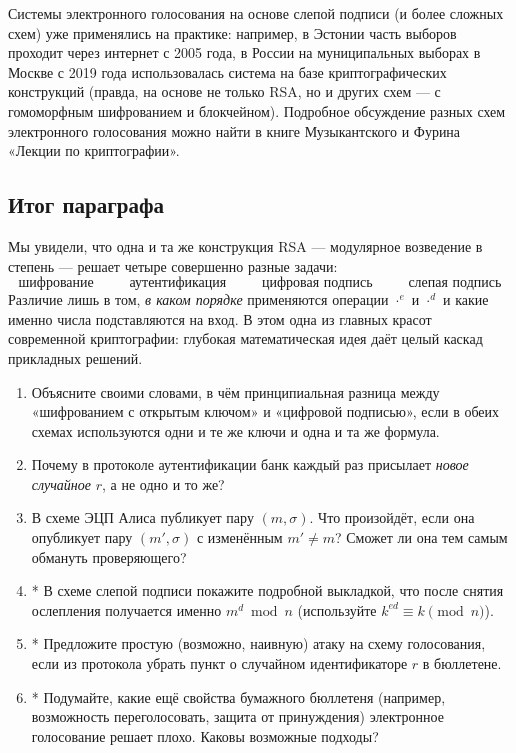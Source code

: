 \begin{interestbox}[title={Это интересно: голосование в реальности}]
Системы электронного голосования на основе слепой подписи (и более сложных схем) уже применялись на практике: например, в Эстонии часть выборов проходит через интернет с 2005 года, в России на муниципальных выборах в Москве с 2019 года использовалась система на базе криптографических конструкций (правда, на основе не только RSA, но и других схем --- с гомоморфным шифрованием и блокчейном). Подробное обсуждение разных схем электронного голосования можно найти в книге Музыкантского и Фурина «Лекции по криптографии».
\end{interestbox}

\subsection{Итог параграфа}

Мы увидели, что одна и та же конструкция RSA --- модулярное возведение в степень --- решает четыре совершенно разные задачи:
\[
  \boxed{\;\text{шифрование}\;} \qquad
  \boxed{\;\text{аутентификация}\;} \qquad
  \boxed{\;\text{цифровая подпись}\;} \qquad
  \boxed{\;\text{слепая подпись}\;}
\]
Различие лишь в том, \emph{в каком порядке} применяются операции $\cdot^{e}$ и $\cdot^{d}$ и какие именно числа подставляются на вход. В этом одна из главных красот современной криптографии: глубокая математическая идея даёт целый каскад прикладных решений.

\begin{tasksbox}
\begin{enumerate}
  \item Объясните своими словами, в чём принципиальная разница между «шифрованием с открытым ключом» и «цифровой подписью», если в обеих схемах используются одни и те же ключи и одна и та же формула.
  \item Почему в протоколе аутентификации банк каждый раз присылает \emph{новое случайное} $r$, а не одно и то же?
  \item В схеме ЭЦП Алиса публикует пару $(m, \sigma)$. Что произойдёт, если она опубликует пару $(m', \sigma)$ с изменённым $m' \ne m$? Сможет ли она тем самым обмануть проверяющего?
  \item* В схеме слепой подписи покажите подробной выкладкой, что после снятия ослепления получается именно $m^d \bmod n$ (используйте $k^{ed} \equiv k \pmod n$).
  \item* Предложите простую (возможно, наивную) атаку на схему голосования, если из протокола убрать пункт о случайном идентификаторе $r$ в бюллетене.
  \item* Подумайте, какие ещё свойства бумажного бюллетеня (например, возможность переголосовать, защита от принуждения) электронное голосование решает плохо. Каковы возможные подходы?
\end{enumerate}
\end{tasksbox}
